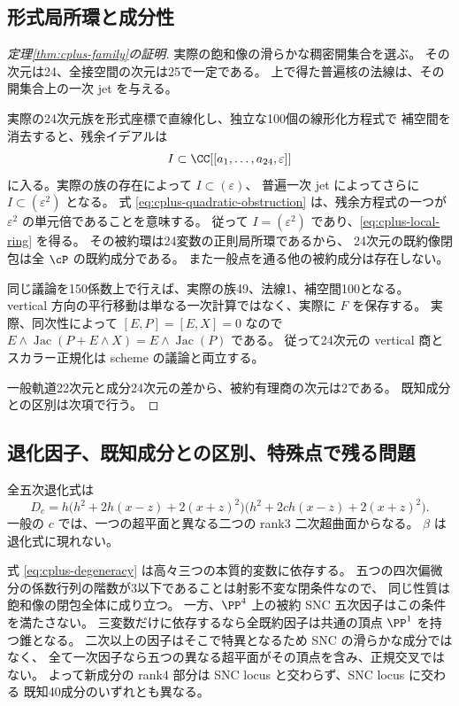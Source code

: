 \subsection{形式局所環と成分性}

\begin{proof}[定理\ref{thm:cplus-family}の証明]
実際の飽和像の滑らかな稠密開集合を選ぶ。
その次元は24、全接空間の次元は25で一定である。
上で得た普遍核の法線は、その開集合上の一次 jet を与える。

実際の24次元族を形式座標で直線化し、独立な100個の線形化方程式で
補空間を消去すると、残余イデアルは
\[
 I\subset\CC[[a_1,\ldots,a_{24},\varepsilon]]
\]
に入る。実際の族の存在によって $I\subset(\varepsilon)$、
普遍一次 jet によってさらに $I\subset(\varepsilon^2)$ となる。
式 \eqref{eq:cplus-quadratic-obstruction} は、残余方程式の一つが
$\varepsilon^2$ の単元倍であることを意味する。
従って $I=(\varepsilon^2)$ であり、\eqref{eq:cplus-local-ring} を得る。
その被約環は24変数の正則局所環であるから、
24次元の既約像閉包は全 $\cP$ の既約成分である。
また一般点を通る他の被約成分は存在しない。

同じ議論を150係数上で行えば、実際の族49、法線1、補空間100となる。
vertical 方向の平行移動は単なる一次計算ではなく、実際に $F$ を保存する。
実際、同次性によって $[E,P]=[E,X]=0$ なので
$E\wedge\operatorname{Jac}(P+E\wedge X)=E\wedge\operatorname{Jac}(P)$ である。
従って24次元の vertical 商とスカラー正規化は scheme の議論と両立する。

一般軌道22次元と成分24次元の差から、被約有理商の次元は2である。
既知成分との区別は次項で行う。
\end{proof}

\subsection{退化因子、既知成分との区別、特殊点で残る問題}

全五次退化式は
\begin{equation}
 D_c=h\bigl(h^2+2h(x-z)+2(x+z)^2\bigr)
          \bigl(h^2+2ch(x-z)+2(x+z)^2\bigr).
 \label{eq:cplus-degeneracy}
\end{equation}
一般の $c$ では、一つの超平面と異なる二つの rank3 二次超曲面からなる。
$\beta$ は退化式に現れない。

式 \eqref{eq:cplus-degeneracy} は高々三つの本質的変数に依存する。
五つの四次偏微分の係数行列の階数が3以下であることは射影不変な閉条件なので、
同じ性質は飽和像の閉包全体に成り立つ。
一方、$\PP^4$ 上の被約 SNC 五次因子はこの条件を満たさない。
三変数だけに依存するなら全既約因子は共通の頂点 $\PP^1$ を持つ錐となる。
二次以上の因子はそこで特異となるため SNC の滑らかな成分ではなく、
全て一次因子なら五つの異なる超平面がその頂点を含み、正規交叉ではない。
よって新成分の rank4 部分は SNC locus と交わらず、SNC locus に交わる
既知40成分のいずれとも異なる。

